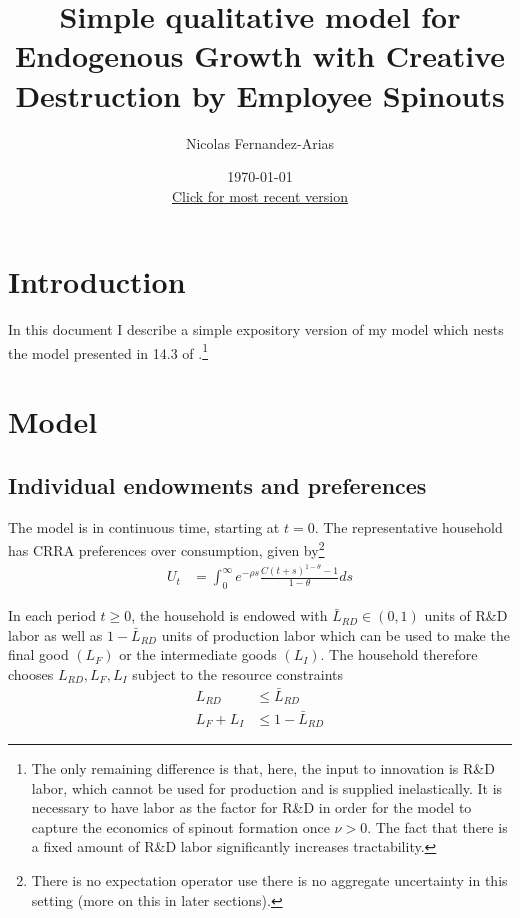 \documentclass[11pt,english]{article}
\theoremstyle{remark}
\begin{document}
	
\title{Simple qualitative model for Endogenous Growth with Creative Destruction by Employee Spinouts}

\author{Nicolas Fernandez-Arias}
\date{\today \\ \small
	\href{https://drive.google.com/file/d/1CI2TL1zOXJyJ9dMulShwZBQxWq7l6zUh/view?usp=sharing}{Click for most recent version}}
\maketitle


\setcounter{tocdepth}{2}
\tableofcontents

\section{Introduction}

In this document I describe a simple expository version of my model which nests the model presented in 14.3 of \cite{acemoglu_introduction_2009}.\footnote{The only remaining difference is that, here, the input to innovation is R\&D labor, which cannot be used for production and is supplied inelastically. It is necessary to have labor as the factor for R\&D in order for the model to capture the economics of spinout formation once $\nu > 0$. The fact that there is a fixed amount of R\&D labor significantly increases tractability.} 

\section{Model}

\subsection{Individual endowments and preferences}

The model is in continuous time, starting at $t = 0$. The representative household has CRRA preferences over consumption, given by\footnote{There is no expectation operator use there is no aggregate uncertainty in this setting (more on this in later sections).}
\begin{align}
U_t &= \int_0^{\infty} e^{-\rho s} \frac{C(t+s)^{1-\theta} - 1}{1-\theta} ds \label{preferences}
\end{align}

In each period $t \ge 0$, the household is endowed with $\bar{L}_{RD} \in (0,1)$ units of R\&D labor as well as $1 - \bar{L}_{RD}$ units of production labor which can be used to make the final good $(L_F)$ or the intermediate goods $(L_I)$. The household therefore chooses $L_{RD},L_F,L_I$ subject to the resource constraints
\begin{align}
L_{RD} &\le \bar{L}_{RD} \label{labor_resource_constraint2} \\
L_F + L_I &\le 1 - \bar{L}_{RD} \label{labor_resource_constraint} 
\end{align}
\end{document}
